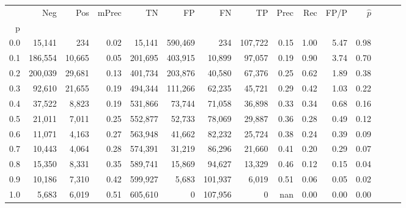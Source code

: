 \begin{tabular}{rrrrrrrrrrrrrrr}
\toprule
{} &      Neg &     Pos & mPrec &       TN &       FP &       FN &       TP &  Prec &   Rec &  FP/P & $\hat{p}$ \\
p   &          &         &       &          &          &          &          &       &       &       &           \\
\midrule
0.0 &   15,141 &     234 &  0.02 &   15,141 &  590,469 &      234 &  107,722 &  0.15 &  1.00 &  5.47 &      0.98 \\
0.1 &  186,554 &  10,665 &  0.05 &  201,695 &  403,915 &   10,899 &   97,057 &  0.19 &  0.90 &  3.74 &      0.70 \\
0.2 &  200,039 &  29,681 &  0.13 &  401,734 &  203,876 &   40,580 &   67,376 &  0.25 &  0.62 &  1.89 &      0.38 \\
0.3 &   92,610 &  21,655 &  0.19 &  494,344 &  111,266 &   62,235 &   45,721 &  0.29 &  0.42 &  1.03 &      0.22 \\
0.4 &   37,522 &   8,823 &  0.19 &  531,866 &   73,744 &   71,058 &   36,898 &  0.33 &  0.34 &  0.68 &      0.16 \\
0.5 &   21,011 &   7,011 &  0.25 &  552,877 &   52,733 &   78,069 &   29,887 &  0.36 &  0.28 &  0.49 &      0.12 \\
0.6 &   11,071 &   4,163 &  0.27 &  563,948 &   41,662 &   82,232 &   25,724 &  0.38 &  0.24 &  0.39 &      0.09 \\
0.7 &   10,443 &   4,064 &  0.28 &  574,391 &   31,219 &   86,296 &   21,660 &  0.41 &  0.20 &  0.29 &      0.07 \\
0.8 &   15,350 &   8,331 &  0.35 &  589,741 &   15,869 &   94,627 &   13,329 &  0.46 &  0.12 &  0.15 &      0.04 \\
0.9 &   10,186 &   7,310 &  0.42 &  599,927 &    5,683 &  101,937 &    6,019 &  0.51 &  0.06 &  0.05 &      0.02 \\
1.0 &    5,683 &   6,019 &  0.51 &  605,610 &        0 &  107,956 &        0 &   nan &  0.00 &  0.00 &      0.00 \\
\bottomrule
\end{tabular}
